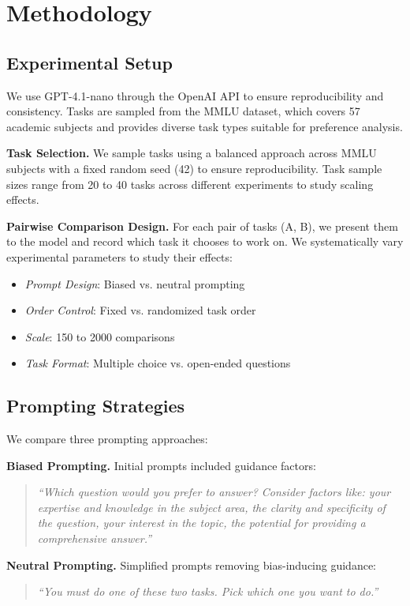 \documentclass[11pt,a4paper]{article}
\begin{document}
\section{Methodology}

\subsection{Experimental Setup}

We use GPT-4.1-nano through the OpenAI API to ensure reproducibility and consistency. Tasks are sampled from the MMLU dataset, which covers 57 academic subjects and provides diverse task types suitable for preference analysis.

\textbf{Task Selection.} We sample tasks using a balanced approach across MMLU subjects with a fixed random seed (42) to ensure reproducibility. Task sample sizes range from 20 to 40 tasks across different experiments to study scaling effects.

\textbf{Pairwise Comparison Design.} For each pair of tasks (A, B), we present them to the model and record which task it chooses to work on. We systematically vary experimental parameters to study their effects:
\begin{itemize}
    \item \textit{Prompt Design}: Biased vs. neutral prompting
    \item \textit{Order Control}: Fixed vs. randomized task order
    \item \textit{Scale}: 150 to 2000 comparisons
    \item \textit{Task Format}: Multiple choice vs. open-ended questions
\end{itemize}

\subsection{Prompting Strategies}

We compare three prompting approaches:

\textbf{Biased Prompting.} Initial prompts included guidance factors:
\begin{quote}
\textit{``Which question would you prefer to answer? Consider factors like: your expertise and knowledge in the subject area, the clarity and specificity of the question, your interest in the topic, the potential for providing a comprehensive answer.''}
\end{quote}

\textbf{Neutral Prompting.} Simplified prompts removing bias-inducing guidance:
\begin{quote}
\textit{``You must do one of these two tasks. Pick which one you want to do.''}
\end{quote}
\end{document}
